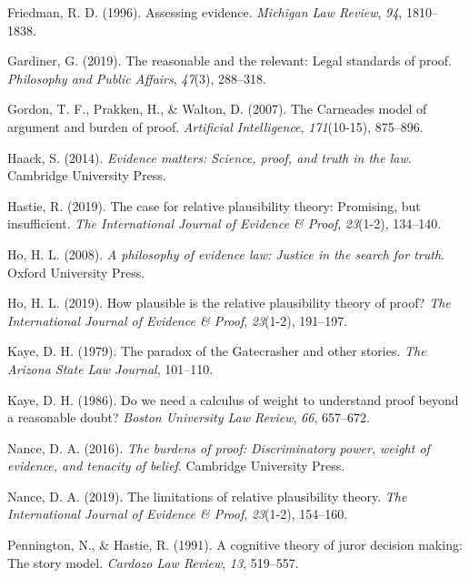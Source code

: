 \documentclass[]{book}
\begin{document}
\hypertarget{ref-friedman1996}{}
Friedman, R. D. (1996). Assessing evidence. \emph{Michigan Law Review},
\emph{94}, 1810--1838.

\hypertarget{ref-gardiner2019ppa}{}
Gardiner, G. (2019). The reasonable and the relevant: Legal standards of
proof. \emph{Philosophy and Public Affairs}, \emph{47}(3), 288--318.

\hypertarget{ref-gordon2007}{}
Gordon, T. F., Prakken, H., \& Walton, D. (2007). The Carneades model of
argument and burden of proof. \emph{Artificial Intelligence},
\emph{171}(10-15), 875--896.

\hypertarget{ref-Haack2014-HAAEMS}{}
Haack, S. (2014). \emph{Evidence matters: Science, proof, and truth in
the law}. Cambridge University Press.

\hypertarget{ref-hastie2019CaseRelativePlausibilitya}{}
Hastie, R. (2019). The case for relative plausibility theory: Promising,
but insufficient. \emph{The International Journal of Evidence \& Proof},
\emph{23}(1-2), 134--140.

\hypertarget{ref-ho2008philosophy}{}
Ho, H. L. (2008). \emph{A philosophy of evidence law: Justice in the
search for truth}. Oxford University Press.

\hypertarget{ref-lai2019HowPlausibleRelative}{}
Ho, H. L. (2019). How plausible is the relative plausibility theory of
proof? \emph{The International Journal of Evidence \& Proof},
\emph{23}(1-2), 191--197.

\hypertarget{ref-Kaye79gate}{}
Kaye, D. H. (1979). The paradox of the Gatecrasher and other stories.
\emph{The Arizona State Law Journal}, 101--110.

\hypertarget{ref-Kaye1986Do}{}
Kaye, D. H. (1986). Do we need a calculus of weight to understand proof
beyond a reasonable doubt? \emph{Boston University Law Review},
\emph{66}, 657--672.

\hypertarget{ref-nance2016}{}
Nance, D. A. (2016). \emph{The burdens of proof: Discriminatory power,
weight of evidence, and tenacity of belief}. Cambridge University Press.

\hypertarget{ref-nance2019LimitationsRelativePlausibility}{}
Nance, D. A. (2019). The limitations of relative plausibility theory.
\emph{The International Journal of Evidence \& Proof}, \emph{23}(1-2),
154--160.

\hypertarget{ref-Pennington1991}{}
Pennington, N., \& Hastie, R. (1991). A cognitive theory of juror
decision making: The story model. \emph{Cardozo Law Review}, \emph{13},
519--557.
\end{document}

